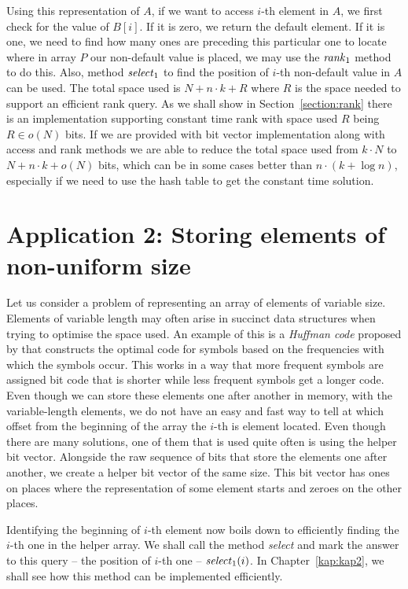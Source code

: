 Using this representation of $A$, if we want to access $i$-th element in $A$, we first check for
the value of $B[i]$. If it is zero, we return the default element. If it is one, we need to find
how many ones are preceding this particular one to locate where in array $P$ our non-default
value is placed, we may use the $\mathit{rank}_1$ method to do this. Also, method $\mathit{select}_1$ to find the
position of $i$-th non-default value in $A$ can be used. The total space used is $N+n\cdot k+R$
where $R$ is the space needed to support an efficient rank query. As we shall show in
Section~\ref{section:rank} there is an implementation supporting constant time rank with space used
$R$ being $R\in o(N)$ bits. If we are provided with bit vector implementation along with access and
rank methods we are able to reduce the total space used from $k\cdot N$ to $N+n\cdot k+o(N)$ bits,
which can be in some cases better than $n\cdot (k+\log n)$, especially if we need to use the hash
table to get the constant time solution.

\section{Application 2: Storing elements of non-uniform size}

Let us consider a problem of representing an array of elements of variable size.
Elements of variable length may often arise in succinct data structures 
when trying to optimise the space used. An example of this is a \textit{Huffman code}
proposed by \cite{huffman1952method} that constructs the optimal code for symbols based
on the frequencies with which the symbols occur. This works in a way
that more frequent symbols are assigned bit code that is shorter while less frequent symbols
get a longer code. Even though we can store these elements one after another in memory, with the
variable-length elements, we do not have an easy and fast way to tell at which offset from the
beginning of the array the $i$-th is element located. Even though there are many solutions, one
of them that is used quite often is using the helper bit vector. Alongside the raw sequence of
bits that store the elements one after another, we create a helper bit vector of the same size.
This bit vector has ones on places where the representation of some element starts and zeroes on
the other places.

Identifying the beginning of $i$-th element now boils down to efficiently finding the
$i$-th one in the helper array. We shall call the method \textit{select} and mark the
answer to this query -- the position of $i$-th one -- $\mathit{select}_1(i)$. In
Chapter~\ref{kap:kap2}, we shall see how this method can be implemented efficiently.

